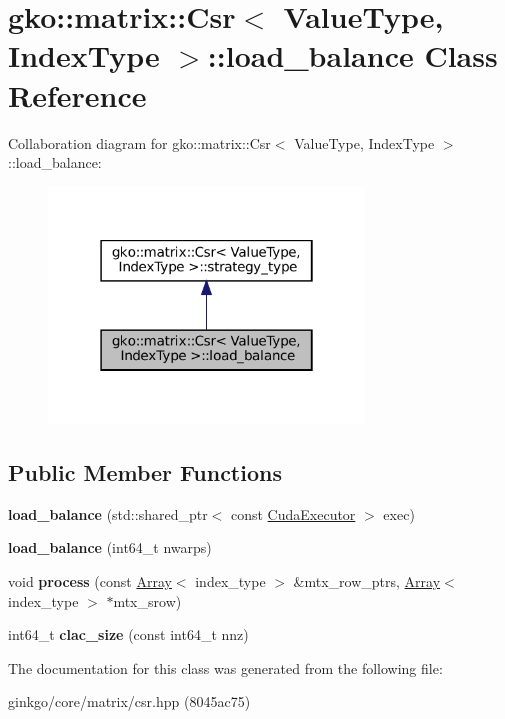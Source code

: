 \hypertarget{classgko_1_1matrix_1_1Csr_1_1load__balance}{}\section{gko\+:\+:matrix\+:\+:Csr$<$ Value\+Type, Index\+Type $>$\+:\+:load\+\_\+balance Class Reference}
\label{classgko_1_1matrix_1_1Csr_1_1load__balance}


Collaboration diagram for gko\+:\+:matrix\+:\+:Csr$<$ Value\+Type, Index\+Type $>$\+:\+:load\+\_\+balance\+:
\nopagebreak
\begin{figure}[H]
\begin{center}
\leavevmode
\includegraphics[width=238pt]{classgko_1_1matrix_1_1Csr_1_1load__balance__coll__graph}
\end{center}
\end{figure}
\subsection*{Public Member Functions}
\begin{DoxyCompactItemize}
\item 
\mbox{\label{classgko_1_1matrix_1_1Csr_1_1load__balance_ad80a0ef5dd9bb2e4f311e59e5e4e013e}} 
{\bfseries load\+\_\+balance} (std\+::shared\+\_\+ptr$<$ const \hyperlink{classgko_1_1CudaExecutor}{Cuda\+Executor} $>$ exec)
\item 
\mbox{\label{classgko_1_1matrix_1_1Csr_1_1load__balance_a851a72f0ac2f8be45982b5aa0b85d15d}} 
{\bfseries load\+\_\+balance} (int64\+\_\+t nwarps)
\item 
\mbox{\label{classgko_1_1matrix_1_1Csr_1_1load__balance_a8219420a14f2d6fc2242897900ce4448}} 
void {\bfseries process} (const \hyperlink{classgko_1_1Array}{Array}$<$ index\+\_\+type $>$ \&mtx\+\_\+row\+\_\+ptrs, \hyperlink{classgko_1_1Array}{Array}$<$ index\+\_\+type $>$ $\ast$mtx\+\_\+srow)
\item 
\mbox{\label{classgko_1_1matrix_1_1Csr_1_1load__balance_aafc499605813d57af41c57744d44e133}} 
int64\+\_\+t {\bfseries clac\+\_\+size} (const int64\+\_\+t nnz)
\end{DoxyCompactItemize}


The documentation for this class was generated from the following file\+:\begin{DoxyCompactItemize}
\item 
ginkgo/core/matrix/csr.\+hpp (8045ac75)\end{DoxyCompactItemize}
